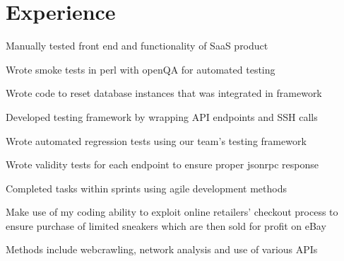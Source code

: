 \documentclass[]{deedy-resume-openfont}
\begin{document}
\begin{minipage}[t]{0.66\textwidth} 


\section{Experience}

\vspace{\topsep} %
\begin{tightemize}
\item Manually tested front end and functionality of SaaS product
\item Wrote smoke tests in perl with openQA for automated testing
\item Wrote code to reset database instances that was integrated in framework 
\item Developed testing framework by wrapping API endpoints and SSH calls
\item Wrote automated regression tests using our team's testing framework
\item Wrote validity tests for each endpoint to ensure proper jsonrpc response
\item Completed tasks within sprints using agile development methods
\end{tightemize}
\sectionsep

\begin{tightemize}
\item Make use of my coding ability to exploit online retailers’ checkout process to
ensure purchase of limited sneakers which are then sold for profit on eBay
\item Methods include webcrawling, network analysis and use of various APIs
\end{tightemize}
\sectionsep


\end{minipage}
\end{document}
